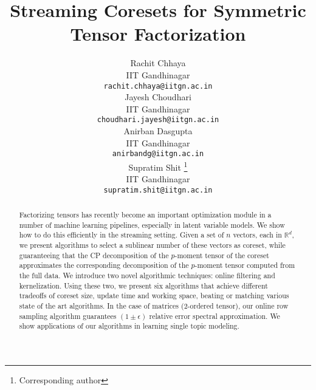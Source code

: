 \documentclass{article}
\title{Streaming Coresets for Symmetric Tensor Factorization}
\author{
  Rachit Chhaya\\
  IIT Gandhinagar\\
  \texttt{rachit.chhaya@iitgn.ac.in} \\
   \And
  Jayesh Choudhari\\
  IIT Gandhinagar\\
  \texttt{choudhari.jayesh@iitgn.ac.in} \\
   \And
 Anirban Dasgupta \\
  IIT Gandhinagar\\
  \texttt{anirbandg@iitgn.ac.in} \\
  \AND
   Supratim Shit \thanks{Corresponding author} \\
  IIT Gandhinagar \\
  \texttt{supratim.shit@iitgn.ac.in} \\
}
\def\~#1{\mathbb{#1}}
\begin{document}
\nocite{*}
\maketitle

\begin{abstract}
Factorizing tensors has recently become an important optimization module in a number of machine learning pipelines, especially in latent variable models. We show how to do this efficiently in the streaming setting. Given a set of $n$ vectors, each in $\~R^d$, we present algorithms to select a sublinear number of these vectors as coreset, while guaranteeing that the CP decomposition of the $p$-moment tensor of the coreset approximates the corresponding decomposition of the $p$-moment tensor computed from the full data. We introduce two novel algorithmic techniques: online filtering and kernelization. Using these two, we present six algorithms that achieve different tradeoffs of coreset size, update time and working space, beating or matching various state of the art algorithms. In the case of matrices ($2$-ordered tensor), our online row sampling algorithm guarantees $(1 \pm \epsilon)$ relative error spectral approximation. We show applications of our algorithms in learning single topic modeling. 
\end{abstract}


\allowdisplaybreaks











% 
\end{document}
